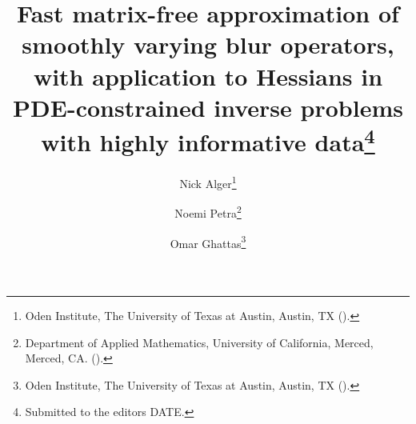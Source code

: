 

\usepackage{lipsum}
\usepackage{amsfonts}
\usepackage{graphicx}
\usepackage{epstopdf}
\usepackage[algo2e, ruled, noend, linesnumbered]{algorithm2e}
\ifpdf
\else
\fi

\newcommand{\creflastconjunction}{, and~}
\newcommand{\nor}[1]{\left\|#1\right\|}



\title{Fast matrix-free approximation of smoothly varying blur operators, with application to Hessians in PDE-constrained inverse problems with highly informative data\thanks{Submitted to the editors DATE.
}}

\author{Nick Alger\thanks{Oden Institute, The University of Texas at Austin, Austin, TX 
  ().}
\and Noemi Petra\thanks{Department of Applied Mathematics, University of California, Merced, Merced, CA. 
  ().}
\and Omar Ghattas\thanks{Oden Institute, The University of Texas at Austin, Austin, TX 
	().}}

\usepackage{amsopn}
\DeclareMathOperator{\diag}{diag}
\DeclareMathOperator{\interpolate}{Interpolate}
\DeclareMathOperator{\Span}{Span}
\DeclareMathOperator{\vol}{vol}

\newcommand{\computediracresponse}[1]{\text{compute\_dirac\_comb\_response}\left( #1 \right)}
\newcommand{\ellipsoidsintersect}[2]{\text{ellipsoids\_intersect}\left( #1, #2 \right)}
\newcommand{\choosebatch}[1]{\text{choose\_sample\_point\_batch}\left( #1 \right)}
\newcommand{\computekernelentries}[2]{\text{compute\_approximate\_kernel\_entries}\left( #1 , #2 \right)}
\newcommand{\computeweightingentries}[1]{\text{compute\_weighting\_function\_entries}\left( #1 \right)}

